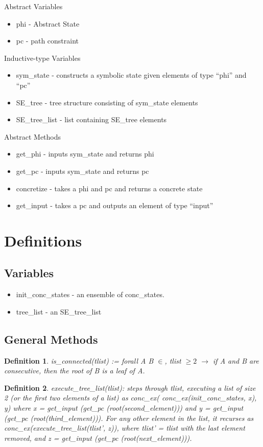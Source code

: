\documentclass[a4paper]{article}
\newtheorem{define}{Definition}
\begin{document}
Abstract Variables
\begin{itemize}
\item phi - Abstract State
\item pc - path constraint
\end{itemize}

Inductive-type Variables
\begin{itemize}
\item sym\_state - constructs a symbolic state given elements of type ``phi'' and ``pc''
\item SE\_tree - tree structure consisting of sym\_state elements
\item SE\_tree\_list - list containing SE\_tree elements
\end{itemize}

Abstract Methods
\begin{itemize}
\item get\_phi - inputs sym\_state and returns phi
\item get\_pc - inputs sym\_state and returns pc
\item concretize - takes a phi and pc and returns a concrete state
\item get\_input - takes a pc and outputs an element of type ``input''
\end{itemize}

\section{Definitions}

\subsection{Variables}
\begin{itemize}
\item init\_conc\_states - an ensemble of conc\_states.
\item tree\_list - an SE\_tree\_list
\end{itemize}

\subsection{General Methods}
\begin{define}
 is\_connected(tlist) :=
 forall A B $\in$, 
 tlist $\geq 2$  $\rightarrow$
if A and B are consecutive, then the root of B is a leaf of A.
\end{define}

\begin{define}
execute\_tree\_list(tlist):  steps through tlist, 
executing a list of size 2 (or the first two elements of a list) as conc\_ex( conc\_ex(init\_conc\_states, x), y)
where x = get\_input (get\_pc (root(second\_element))) and y = get\_input (get\_pc (root(third\_element))).
For any other element in the list, it recurses as conc\_ex(execute\_tree\_list(tlist', z)), where tlist' = tlist with the last element removed, and z = get\_input (get\_pc (root(next\_element))).
\end{define}
\end{document}
